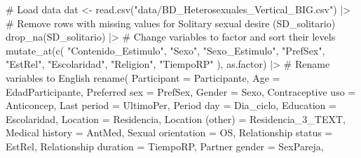 \documentclass[
  bookmarksnumbered]{article}
\newenvironment{Shaded}{\begin{snugshade}}{\end{snugshade}}
\newcommand{\AttributeTok}[1]{\textcolor[rgb]{0.80,0.80,0.80}{#1}}
\newcommand{\CommentTok}[1]{\textcolor[rgb]{0.50,0.62,0.50}{#1}}
\newcommand{\FunctionTok}[1]{\textcolor[rgb]{0.94,0.94,0.56}{#1}}
\newcommand{\NormalTok}[1]{\textcolor[rgb]{0.80,0.80,0.80}{#1}}
\newcommand{\OtherTok}[1]{\textcolor[rgb]{0.94,0.94,0.56}{#1}}
\newcommand{\SpecialCharTok}[1]{\textcolor[rgb]{0.86,0.64,0.64}{#1}}
\newcommand{\StringTok}[1]{\textcolor[rgb]{0.80,0.58,0.58}{#1}}
\begin{document}
\begin{Shaded}
\begin{Highlighting}[]
\CommentTok{\# Load data}
\NormalTok{dat }\OtherTok{\textless{}{-}} \FunctionTok{read.csv}\NormalTok{(}\StringTok{"data/BD\_Heterosexuales\_Vertical\_BIG.csv"}\NormalTok{) }\SpecialCharTok{|\textgreater{}}
  \CommentTok{\# Remove rows with missing values for Solitary sexual desire (SD\_solitario)}
  \FunctionTok{drop\_na}\NormalTok{(SD\_solitario) }\SpecialCharTok{|\textgreater{}}
  \CommentTok{\# Change variables to factor and sort their levels}
  \FunctionTok{mutate\_at}\NormalTok{(}\FunctionTok{c}\NormalTok{(}
    \StringTok{"Contenido\_Estimulo"}\NormalTok{, }\StringTok{"Sexo"}\NormalTok{, }\StringTok{"Sexo\_Estimulo"}\NormalTok{, }\StringTok{"PrefSex"}\NormalTok{, }\StringTok{"EstRel"}\NormalTok{, }\StringTok{"Escolaridad"}\NormalTok{,}
    \StringTok{"Religion"}\NormalTok{, }\StringTok{"TiempoRP"}
\NormalTok{  ), as.factor) }\SpecialCharTok{|\textgreater{}}
  \CommentTok{\# Rename variables to English}
  \FunctionTok{rename}\NormalTok{(}
    \AttributeTok{Participant =}\NormalTok{ Participante,}
    \AttributeTok{Age =}\NormalTok{ EdadParticipante,}
    \StringTok{\textasciigrave{}}\AttributeTok{Preferred sex}\StringTok{\textasciigrave{}} \OtherTok{=}\NormalTok{ PrefSex,}
    \AttributeTok{Gender =}\NormalTok{ Sexo,}
    \StringTok{\textasciigrave{}}\AttributeTok{Contraceptive uso}\StringTok{\textasciigrave{}} \OtherTok{=}\NormalTok{ Anticoncep,}
    \StringTok{\textasciigrave{}}\AttributeTok{Last period}\StringTok{\textasciigrave{}} \OtherTok{=}\NormalTok{ UltimoPer,}
    \StringTok{\textasciigrave{}}\AttributeTok{Period day}\StringTok{\textasciigrave{}} \OtherTok{=}\NormalTok{ Dia\_ciclo,}
    \AttributeTok{Education =}\NormalTok{ Escolaridad,}
    \AttributeTok{Location =}\NormalTok{ Residencia,}
    \StringTok{\textasciigrave{}}\AttributeTok{Location (other)}\StringTok{\textasciigrave{}} \OtherTok{=}\NormalTok{ Residencia\_3\_TEXT,}
    \StringTok{\textasciigrave{}}\AttributeTok{Medical history}\StringTok{\textasciigrave{}} \OtherTok{=}\NormalTok{ AntMed,}
    \StringTok{\textasciigrave{}}\AttributeTok{Sexual orientation}\StringTok{\textasciigrave{}} \OtherTok{=}\NormalTok{ OS,}
    \StringTok{\textasciigrave{}}\AttributeTok{Relationship status}\StringTok{\textasciigrave{}} \OtherTok{=}\NormalTok{ EstRel,}
    \StringTok{\textasciigrave{}}\AttributeTok{Relationship duration}\StringTok{\textasciigrave{}} \OtherTok{=}\NormalTok{ TiempoRP,}
    \StringTok{\textasciigrave{}}\AttributeTok{Partner gender}\StringTok{\textasciigrave{}} \OtherTok{=}\NormalTok{ SexPareja,}

\end{Highlighting}
\end{Shaded}
\end{document}
